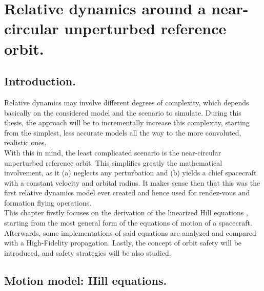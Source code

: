 \chapter{Relative dynamics around a near-circular unperturbed reference orbit.}
%
\label{chap:Chap_2}
%
\section{Introduction.}
%
\indent Relative dynamics may involve different degrees of complexity, which depends basically on the considered model and the scenario to simulate. During this thesis, the approach will be to incrementally increase this complexity, starting from the simplest, less accurate models all the way to the more convoluted, realistic ones. \\
%
\indent With this in mind, the least complicated scenario is the near-circular unperturbed reference orbit. This simplifies greatly the mathematical involvement, as it (a) neglects any perturbation and (b) yields a chief spacecraft with a constant velocity and orbital radius. It makes sense then that this was the first relative dynamics model ever created and hence used for rendez-vous and formation flying operations.\\
%
\indent This chapter firstly focuses on the derivation of the linearized Hill equations \cite{Hill}, starting from the most general form of the equations of motion of a spacecraft. Afterwards, some implementations of said equations are analyzed and compared with a High-Fidelity propagation. Lastly, the concept of orbit safety will be introduced, and safety strategies will be also studied.
%
\section{Motion model: Hill equations.}
%
\indent
%
